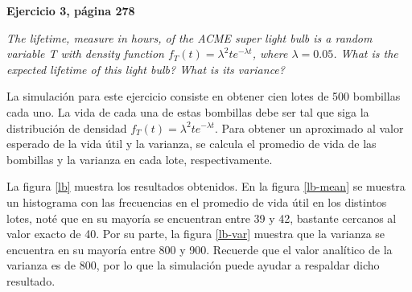 \documentclass[12pt]{article}
\begin{document}
	{\bf Ejercicio 3, página 278}
	
	{\em The lifetime, measure in hours, of the ACME super light bulb is a random variable T with density function \(f_T (t) = \lambda^2 te^{- \lambda t}\), where \(\lambda = 0.05\). What is the expected lifetime of this light bulb? What is its variance?}
	
	La simulación para este ejercicio consiste en obtener cien lotes de 500 bombillas cada uno. La vida de cada una de estas bombillas debe ser tal que siga la distribución de densidad $f_T (t) = \lambda^2 te^{- \lambda t}$. Para obtener un aproximado al valor esperado de la vida útil y la varianza, se calcula el promedio de vida de las bombillas y la varianza en cada lote, respectivamente.
	
	La figura \ref{lb} muestra los resultados obtenidos. En la figura \ref{lb-mean} se muestra un histograma con las frecuencias en el promedio de vida útil en los distintos lotes, noté que en su mayoría se encuentran entre 39 y 42, bastante cercanos al valor exacto de 40. Por su parte, la figura \ref{lb-var} muestra que la varianza se encuentra en su mayoría entre 800 y 900. Recuerde que el valor analítico de la varianza es de 800, por lo que la simulación puede ayudar a respaldar dicho resultado.
	
\end{document}
